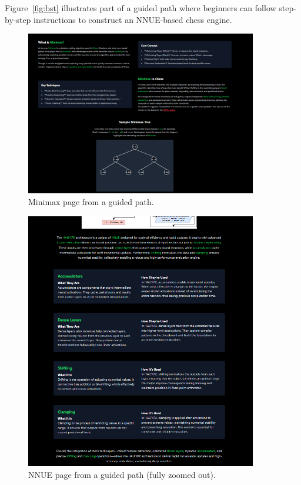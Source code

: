 \documentclass[12pt,a4paper]{article}
\begin{document}
\noindent
Figure~\ref{fig:bst} illustrates part of a guided path where beginners 
can follow step-by-step instructions to construct an NNUE-based chess engine.

\FloatBarrier
\begin{figure}[htbp]
  \centering
  \includegraphics[width=0.9\textwidth]{figures/Minimaxguided.png}
  \caption{Minimax page from a guided path.}
  \label{fig:minimaxguided}
\end{figure}

\begin{figure}[htbp]
  \centering
  \includegraphics[width=0.9\textwidth]{figures/Nnnueguided.png}
  \caption{NNUE page from a guided path (fully zoomed out).}
  \label{fig:nnueguided}
\end{figure}
\end{document}
